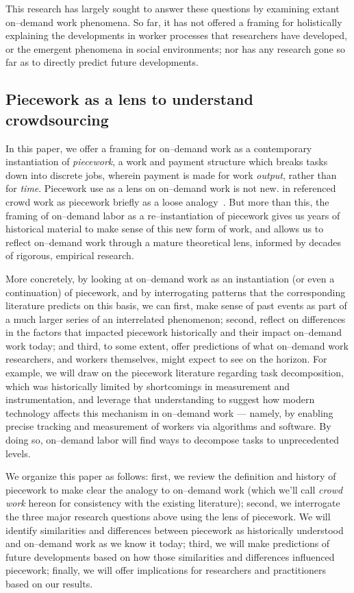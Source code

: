 \documentclass[trackingWork]{subfiles}
\begin{document}
This research has largely sought to answer these questions by examining extant on--demand work phenomena.
So far, it has not offered a framing for holistically explaining
the developments in worker processes that researchers have developed, or
the emergent phenomena in social environments;
nor has any research
gone so far as to directly predict future developments.

\subsection{Piecework as a lens to understand crowdsourcing}
In this paper, we offer a framing for on--demand work as a contemporary instantiation of \textit{piecework},
a work and payment structure which breaks tasks down into discrete jobs,
wherein payment is made for work \textit{output}, rather than for \textit{time}.
Piecework use as a lens on on--demand work is not new.
\citeauthor{crowdworkFuture} in \citeyear{crowdworkFuture}
referenced crowd work as piecework briefly
as a loose analogy~\cite{crowdworkFuture}.
But more than this,
the framing of on--demand labor as a re--instantiation of piecework
gives us years of historical material to make sense of this new form of work, and allows us to reflect on--demand work through a mature theoretical lens, informed by decades of rigorous, empirical research.

More concretely, by looking at on--demand work as
an instantiation (or even a continuation) of piecework,
and by interrogating patterns that the corresponding literature predicts
on this basis, we can
first, make sense of past events as part of a much larger series of an interrelated phenomenon;
second, reflect on differences in the factors that impacted piecework historically and their impact on--demand work today;
and third, to some extent, offer predictions of what on--demand work researchers,
and workers themselves,
might expect to see on the horizon.
For example, we will draw on the piecework literature regarding task decomposition,
which was historically limited by shortcomings in measurement and instrumentation, and
leverage that understanding to suggest how modern technology affects this mechanism in on--demand work
--- namely, by enabling precise tracking and measurement of workers via algorithms and software.
By doing so, on--demand labor will find ways to decompose tasks to unprecedented levels.


We organize this paper as follows:
first, we review the definition and history of piecework
to make clear the analogy to on--demand work
(which we'll call \textit{crowd work} hereon
for consistency with the existing literature);
second, we interrogate the three major research questions above using the lens of piecework. 
We will identify similarities and differences between piecework as historically understood and
on--demand work as we know it today;
third, we will make predictions of future developments based on how those similarities and differences influenced piecework;
finally, we will offer implications for researchers and practitioners based on our results.

\onlyinsubfile{
  \clearpage
  \balance{}
  \printbibliography
}
\end{document}
